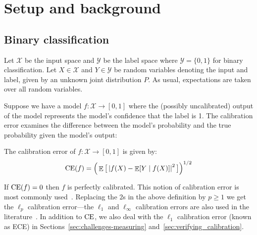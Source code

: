\section{Setup and background}
\label{sec:formulation}

\newcommand{\ce}[0]{\ensuremath{\textup{CE}}}
\newcommand{\lpce}[0]{\ensuremath{\ell_p\textup{-CE}}}
\newcommand{\ltwoce}[0]{\ensuremath{\ell_2\textup{-CE}}}
\newcommand{\lsquared}[0]{\ensuremath{L^2}}
\newcommand{\squaredce}[0]{\ensuremath{L^2\textup{-CE}}}
\newcommand{\topce}[0]{\ensuremath{\textup{TCE}}}
\newcommand{\margsquaredce}[0]{\ensuremath{\textup{MCE}}}
\newcommand{\mse}[0]{\ensuremath{\textup{MSE}}}

\subsection{Binary classification}

Let $\mathcal{X}$ be the input space and $\mathcal{Y}$ be the label space where $\mathcal{Y} = \{0, 1\}$ for binary classification.
Let $X \in \mathcal{X}$ and $Y \in \mathcal{Y}$ be random variables denoting the input and label, given by an unknown joint distribution $P$. As usual, expectations are taken over all random variables.

Suppose we have a model $f : \mathcal{X} \to [0, 1]$ where the (possibly uncalibrated) output of the model represents the model's confidence that the label is 1. The calibration error examines the difference between the model's probability and the true probability given the model's output:

\begin{definition}
The calibration error of $f : \mathcal{X} \to [0, 1]$ is given by:
\begin{align}
\ce(f) = \Big(\expect\big[ \left|f(X) - \expect[Y \mid f(X)] \right|^2 \big] \Big)^{1/2}
\end{align}
\end{definition}

If $\ce(f) = 0$ then $f$ is perfectly calibrated. This notion of calibration error is most commonly used~\cite{murphy1973vector,murphy1977reliability,degroot1983forecasters, nguyen2015posterior, hendrycks2019anomaly, kuleshov2015calibrated, hendrycks2019pretraining, brocker2012empirical}. Replacing the $2$s in the above definition by $p \geq 1$ we get the $\ell_p$ calibration error---the $\ell_1$ and $\ell_{\infty}$ calibration errors are also used in the literature~\cite{guo2017calibration, naeini2015obtaining, nixon2019calibration}. In addition to $\ce{}$, we also deal with the $\ell_1$ calibration error (known as ECE) in Sections~\ref{sec:challenges-measuring} and~\ref{sec:verifying_calibration}.

